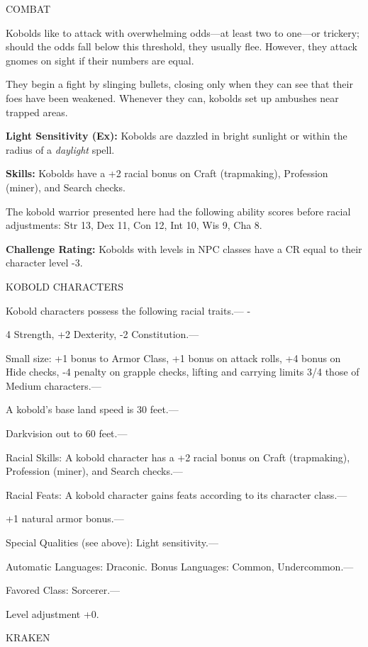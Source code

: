 \documentclass{article}
\begin{document}
COMBAT

Kobolds like to attack with overwhelming odds---at least two to one---or trickery; 
should the odds fall below this threshold, they usually flee. However, they attack 
gnomes on sight if their numbers are equal.

They begin a fight by slinging bullets, closing only when they can see that their 
foes have been weakened. Whenever they can, kobolds set up ambushes near trapped 
areas.

\textbf{Light Sensitivity (Ex): }Kobolds are dazzled in bright sunlight or within 
the radius of a \textit{daylight }spell.

\textbf{Skills:} Kobolds have a +2 racial bonus on Craft (trapmaking), Profession 
(miner), and Search checks.

The kobold warrior presented here had the following ability scores before racial 
adjustments: Str 13, Dex 11, Con 12, Int 10, Wis 9, Cha 8.

\textbf{Challenge Rating:} Kobolds with levels in NPC classes have a CR equal to 
their character level -3.

KOBOLD CHARACTERS

Kobold characters possess the following racial traits.--- -

\parindent=3pt
4 Strength, +2 Dexterity, -2 Constitution.---

\parindent=0pt
Small size: +1 bonus to Armor Class, +1 bonus on attack rolls, +4 bonus on Hide 
checks, -4 penalty on grapple checks, lifting and carrying limits 3/4 those of 
Medium characters.---

A kobold's base land speed is 30 feet.---

Darkvision out to 60 feet.---

Racial Skills: A kobold character has a +2 racial bonus on Craft (trapmaking), 
Profession (miner), and Search checks.---

Racial Feats: A kobold character gains feats according to its character class.--- 

\parindent=3pt
+1 natural armor bonus.---

\parindent=0pt
Special Qualities (see above): Light sensitivity.---

Automatic Languages: Draconic. Bonus Languages: Common, Undercommon.---

Favored Class: Sorcerer.---

Level adjustment +0.

\vspace{12pt}
{\LARGE{}KRAKEN}
\end{document}
